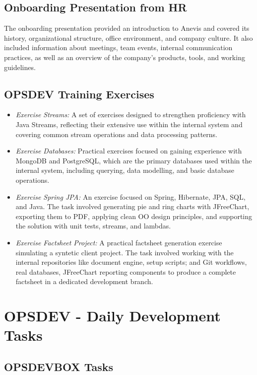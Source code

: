 \subsection{Onboarding Presentation from HR}
The onboarding presentation provided an introduction to Anevis and covered its history, organizational structure, office environment, and company culture. It also included information about meetings, team events, internal communication practices, as well as an overview of the company's products, tools, and working guidelines.

\subsection{OPSDEV Training Exercises}

\begin{itemize}
\item \textit{Exercise Streams:} A set of exercises designed to strengthen proficiency with Java Streams, reflecting their extensive use within the internal system and covering common stream operations and data processing patterns.
\item \textit{Exercise Databases:} Practical exercises focused on gaining experience with MongoDB and PostgreSQL, which are the primary databases used within the internal system, including querying, data modelling, and basic database operations.
\item \textit{Exercise Spring JPA:} An exercise focused on Spring, Hibernate, JPA, SQL, and Java. The task involved generating pie and ring charts with JFreeChart, exporting them to PDF, applying clean OO design principles, and supporting the solution with unit tests, streams, and lambdas.
\item \textit{Exercise Factsheet Project:} A practical factsheet generation exercise simulating a syntetic client project. The task involved working with the internal repositories like document engine, setup scripts; and Git workflows, real databases, JFreeChart reporting components to produce a complete factsheet in a dedicated development branch.

\end{itemize}

\section{OPSDEV - Daily Development Tasks}

\subsection*{OPSDEVBOX Tasks}

